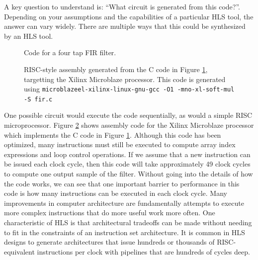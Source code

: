 A key question to understand is: ``What circuit is generated from this code?''.  Depending on your assumptions and the capabilities of a particular HLS tool, the answer can vary widely. There are multiple ways that this could be synthesized by an HLS tool. %

\begin{figure}
{

}
\caption{Code for a four tap FIR filter.
}\label{fig:FIR}
\end{figure}

\begin{figure}
{
\hbox{}\hbox{}
}
\caption{RISC-style assembly generated from the C code in Figure \ref{fig:FIR}, targetting the Xilinx Microblaze processor.  This code is generated using \texttt{microblazeel-xilinx-linux-gnu-gcc -O1 -mno-xl-soft-mul -S fir.c}}\label{fig:FIR_microblaze}
\end{figure}

One possible circuit would execute the code sequentially, as would a simple RISC microprocessor.  Figure \ref{fig:FIR_microblaze} shows assembly code for the Xilinx Microblaze processor which implements the C code in Figure \ref{fig:FIR}.  Although this code has been optimized, many instructions must still be executed to compute array index expressions and loop control operations.  If we assume that a new instruction can be issued each clock cycle, then this code will take approximately 49 clock cycles to compute one output sample of the filter.  Without going into the details of how the code works, we can see that one important barrier to performance in this code is how many instructions can be executed in each clock cycle.  Many improvements in computer architecture are fundamentally attempts to execute more complex instructions that do more useful work more often.  One characteristic of HLS is that architectural tradeoffs can be made without needing to fit in the constraints of an instruction set architecture.  It is common in HLS designs to generate architectures that issue hundreds or thousands of RISC-equivalent instructions per clock with pipelines that are hundreds of cycles deep.

